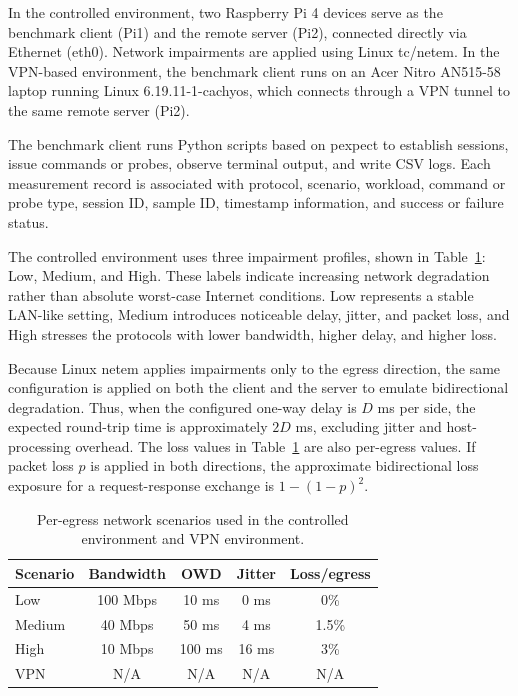 In the controlled environment, two Raspberry Pi 4 devices serve as the benchmark client (Pi1) and the remote server (Pi2), connected directly via Ethernet (eth0). Network impairments are applied using Linux tc/netem. In the VPN-based environment, the benchmark client runs on an Acer Nitro AN515-58 laptop running Linux 6.19.11-1-cachyos, which connects through a VPN tunnel to the same remote server (Pi2).

The benchmark client runs Python scripts based on pexpect to establish sessions, issue commands or probes, observe terminal output, and write CSV logs. Each measurement record is associated with protocol, scenario, workload, command or probe type, session ID, sample ID, timestamp information, and success or failure status.

The controlled environment uses three impairment profiles, shown in Table~\ref{tab:network-scenarios}: Low, Medium, and High. These labels indicate increasing network degradation rather than absolute worst-case Internet conditions. Low represents a stable LAN-like setting, Medium introduces noticeable delay, jitter, and packet loss, and High stresses the protocols with lower bandwidth, higher delay, and higher loss.

Because Linux netem applies impairments only to the egress direction, the same configuration is applied on both the client and the server to emulate bidirectional degradation. Thus, when the configured one-way delay is $D$ ms per side, the expected round-trip time is approximately $2D$ ms, excluding jitter and host-processing overhead. The loss values in Table~\ref{tab:network-scenarios} are also per-egress values. If packet loss $p$ is applied in both directions, the approximate bidirectional loss exposure for a request-response exchange is $1-(1-p)^2$.

\begin{table}[t]
\centering
\caption{Per-egress network scenarios used in the controlled environment and VPN environment.}
\label{tab:network-scenarios}
\begin{tabular}{lcccc}
\toprule
Scenario & Bandwidth & OWD & Jitter & Loss/egress \\
\midrule
Low & 100 Mbps & 10 ms & 0 ms & 0\% \\
Medium & 40 Mbps & 50 ms & 4 ms & 1.5\% \\
High & 10 Mbps & 100 ms & 16 ms & 3\% \\
VPN & N/A & N/A & N/A & N/A \\
\bottomrule
\end{tabular}
\end{table}

